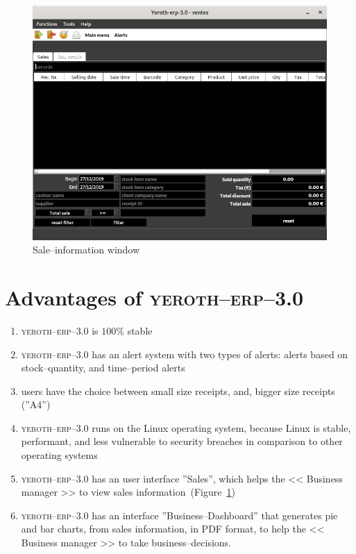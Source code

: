 \documentclass[a4paper, 10pt, twocolumn]{article}
\newcommand{\yeren}{\textsc{yeroth--erp--3.0}\xspace}
\newcommand{\manager}{<< Business manager >>\xspace}
\begin{document}
\begin{figure}[!htbp]
\centering
\includegraphics[scale=0.32]{../../francais/images/yeren-window-sale-information.png}
\caption{Sale--information window}
\label{fig:fenetre-de-la-vente}
\end{figure}

\vspace{-1.9em}
\section{Advantages of \yeren}
\vspace{-0.3em}
\begin{enumerate}[1)]
	\itemsep -0.3em
	\item \yeren is $100\%$ stable
	\item \yeren has an alert system with two types of alerts:
	      alerts based on stock--quantity, and time--period alerts
	\item users have the choice between small size receipts,
	      and, bigger size receipts (''A4'')
	\item \yeren runs on the Linux operating system,
	      because Linux is stable, performant, and less
	      vulnerable to security breaches in comparison
	      to other operating systems
	\item \yeren has an user interface ''Sales'', which
	      helps the \manager to view sales
	      information~(Figure~\ref{fig:fenetre-de-la-vente})
	\item \yeren has an interface ''Business--Dashboard'' that
		  generates pie and bar charts, from sales information,
		  in PDF format, to help the \manager to take
		  business--decisions.
\end{enumerate}
\end{document}

